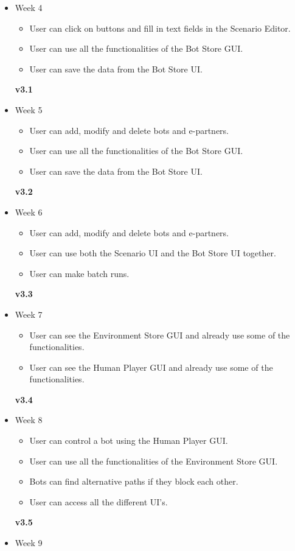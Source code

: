 \begin{itemize}
  \item Week 4
  \begin{itemize}
    \item User can click on buttons and fill in text fields in the Scenario Editor.
    \item User can use all the functionalities of the Bot Store GUI.
    \item User can save the data from the Bot Store UI. 
  \end{itemize}
  \textbf{v3.1}
  \item Week 5
  \begin{itemize}
    \item User can add, modify and delete bots and e-partners.
    \item User can use all the functionalities of the Bot Store GUI.
    \item User can save the data from the Bot Store UI. 
  \end{itemize}
  \textbf{v3.2}
  \item Week 6
  \begin{itemize}
    \item User can add, modify and delete bots and e-partners.
    \item User can use both the Scenario UI and the Bot Store UI together.
    \item User can make batch runs.
  \end{itemize}
  \textbf{v3.3}
  \item Week 7
  \begin{itemize}
    \item User can see the Environment Store GUI and already use some of the functionalities.
    \item User can see the Human Player GUI and already use some of the functionalities.
  \end{itemize}
  \textbf{v3.4}
  \item Week 8
  \begin{itemize}
    \item User can control a bot using the Human Player GUI.
    \item User can use all the functionalities of the Environment Store GUI.
    \item Bots can find alternative paths if they block each other.
    \item User can access all the different UI's. 
  \end{itemize}
  \textbf{v3.5}
  \item Week 9 

\end{itemize}
